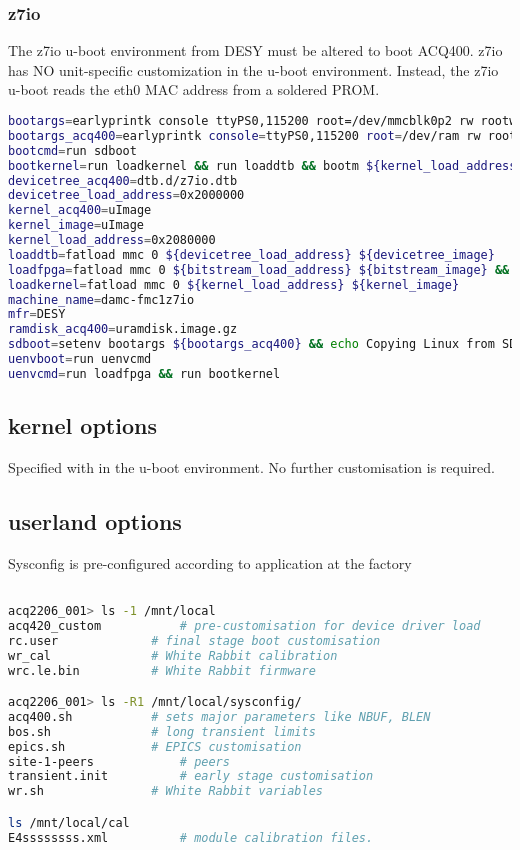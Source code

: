 \documentclass[]{article}
\begin{document}
\subsubsection{z7io}
The z7io u-boot environment from DESY must be altered to boot ACQ400.
z7io has NO unit-specific customization in the u-boot environment. Instead, the z7io u-boot reads the eth0 MAC address from a soldered PROM.

\begin{lstlisting}[language=bash,style=bashstyle,frame=single]
bootargs=earlyprintk console ttyPS0,115200 root=/dev/mmcblk0p2 rw rootwait
bootargs_acq400=earlyprintk console=ttyPS0,115200 root=/dev/ram rw rootwait
bootcmd=run sdboot
bootkernel=run loadkernel && run loaddtb && bootm ${kernel_load_address} - ${devicetree_load_address}
devicetree_acq400=dtb.d/z7io.dtb
devicetree_load_address=0x2000000
kernel_acq400=uImage
kernel_image=uImage
kernel_load_address=0x2080000
loaddtb=fatload mmc 0 ${devicetree_load_address} ${devicetree_image}
loadfpga=fatload mmc 0 ${bitstream_load_address} ${bitstream_image} && fpga ${bitstream_type} 0 ${bitstream_load_address} ${filesize}
loadkernel=fatload mmc 0 ${kernel_load_address} ${kernel_image}
machine_name=damc-fmc1z7io
mfr=DESY
ramdisk_acq400=uramdisk.image.gz
sdboot=setenv bootargs ${bootargs_acq400} && echo Copying Linux from SD to RAM... && mmcinfo && fatload mmc 0 0x3000000 ${kernel_acq400} && fatload mmc 0 0x2A00000 ${devicetree_acq400} && fatload mmc 0 0x2000000 ${ramdisk_acq400} && bootm 0x3000000 0x2000000 0x2A00000
uenvboot=run uenvcmd
uenvcmd=run loadfpga && run bootkernel
\end{lstlisting}

\subsection{kernel options}
Specified with  in the u-boot environment. No further customisation is required.

\pagebreak
\subsection{userland options}

Sysconfig is pre-configured according to application at the factory

\begin{lstlisting}[language=bash,style=bashstyle,frame=single]

acq2206_001> ls -1 /mnt/local
acq420_custom			# pre-customisation for device driver load
rc.user				# final stage boot customisation
wr_cal				# White Rabbit calibration
wrc.le.bin			# White Rabbit firmware

acq2206_001> ls -R1 /mnt/local/sysconfig/
acq400.sh			# sets major parameters like NBUF, BLEN
bos.sh				# long transient limits
epics.sh			# EPICS customisation
site-1-peers			# peers
transient.init			# early stage customisation
wr.sh				# White Rabbit variables

ls /mnt/local/cal
E4ssssssss.xml			# module calibration files.
\end{lstlisting}
\end{document}

